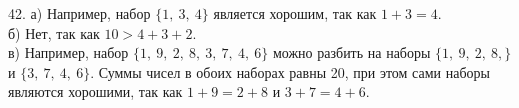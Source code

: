 42. а) Например, набор $\{1,\ 3,\ 4\}$ является хорошим, так как $1+3=4.$\\
б) Нет, так как $10>4+3+2.$\\
в) Например, набор $\{1,\ 9,\ 2,\ 8,\ 3,\ 7,\ 4,\ 6\}$ можно разбить на наборы $\{1,\ 9,\ 2,\ 8,\}$ и $\{3,\ 7,\ 4,\ 6\}.$ Суммы чисел в обоих наборах равны 20, при этом сами наборы являются хорошими, так как $1+9=2+8$ и $3+7=4+6.$\\
